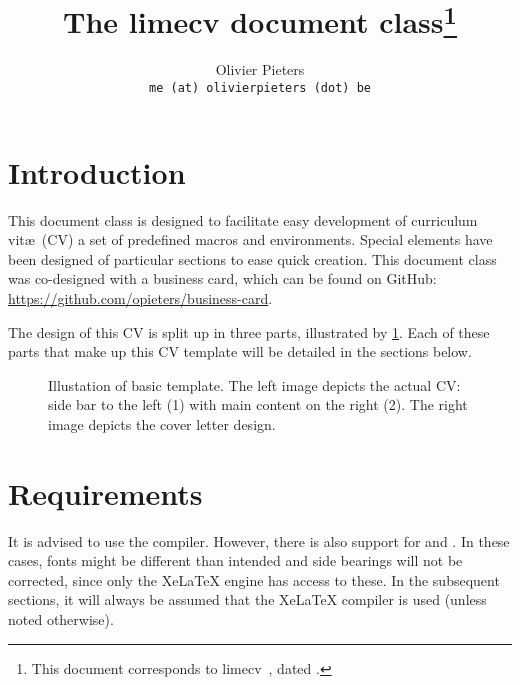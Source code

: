 \documentclass{ltxdoc}
\title{The \textsf{limecv} document class\thanks{This document corresponds to \textsf{limecv}~\fileversion, dated \filedate.}}
\author{Olivier Pieters \\ \texttt{me (at) olivierpieters (dot) be}}
\begin{document}
\maketitle

\tableofcontents

\section{Introduction}

  This document class is designed to facilitate easy development of curriculum vit\ae\ (CV) a set of predefined macros and environments. Special elements have been designed of particular sections to ease quick creation. This document class was co-designed with a business card, which can be found on GitHub: \url{https://github.com/opieters/business-card}.

  The design of this CV is split up in three parts, illustrated by \cref{design}. Each of these parts that make up this CV template will be detailed in the sections below.

\begin{figure}[!ht]
  \centering
  \hspace{2cm}%
  \caption{Illustation of basic template. The left image depicts the actual CV: side bar to the left (1) with main content on the right (2). The right image depicts the cover letter design.}
  \label{design}
\end{figure}

\section{Requirements}

  It is advised to use the  compiler. However, there is also support for  and . In these cases, fonts might be different than intended and side bearings will not be corrected, since only the XeLaTeX engine has access to these. In the subsequent sections, it will always be assumed that the XeLaTeX compiler is used (unless noted otherwise). 
\end{document}
